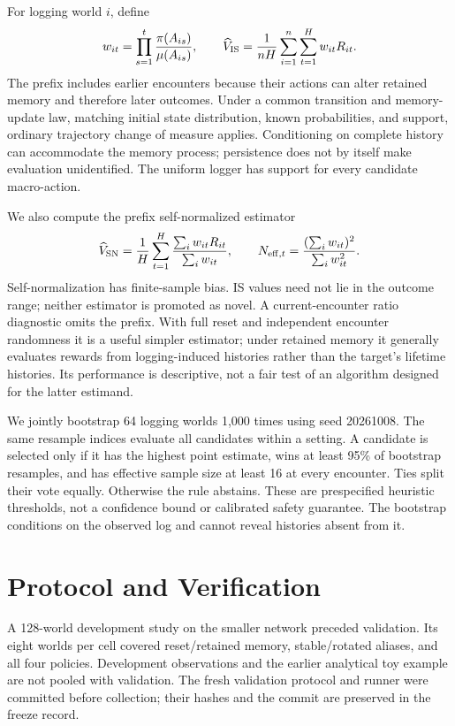 \documentclass[sigconf,nonacm]{acmart}
\begin{document}
For logging world $i$, define
\begin{equation}
w_{it}=\prod_{s=1}^{t}\frac{\pi(A_{is})}{\mu(A_{is})},\qquad
\widehat V_{\rm IS}=\frac{1}{nH}\sum_{i=1}^n\sum_{t=1}^H w_{it}R_{it}.
\end{equation}
The prefix includes earlier encounters because their actions can alter retained memory and therefore later outcomes. Under a common transition and memory-update law, matching initial state distribution, known probabilities, and support, ordinary trajectory change of measure applies. Conditioning on complete history can accommodate the memory process; persistence does not by itself make evaluation unidentified. The uniform logger has support for every candidate macro-action.

We also compute the prefix self-normalized estimator
\begin{equation}
\widehat V_{\rm SN}=\frac1H\sum_{t=1}^{H}\frac{\sum_i w_{it}R_{it}}{\sum_i w_{it}},\qquad
N_{{\rm eff},t}=\frac{(\sum_i w_{it})^2}{\sum_i w_{it}^2}.
\end{equation}
Self-normalization has finite-sample bias. IS values need not lie in the outcome range; neither estimator is promoted as novel. A current-encounter ratio diagnostic omits the prefix. With full reset and independent encounter randomness it is a useful simpler estimator; under retained memory it generally evaluates rewards from logging-induced histories rather than the target's lifetime histories. Its performance is descriptive, not a fair test of an algorithm designed for the latter estimand.

We jointly bootstrap 64 logging worlds 1,000 times using seed 20261008. The same resample indices evaluate all candidates within a setting. A candidate is selected only if it has the highest point estimate, wins at least 95\% of bootstrap resamples, and has effective sample size at least 16 at every encounter. Ties split their vote equally. Otherwise the rule abstains. These are prespecified heuristic thresholds, not a confidence bound or calibrated safety guarantee. The bootstrap conditions on the observed log and cannot reveal histories absent from it.

\section{Protocol and Verification}
A 128-world development study on the smaller network preceded validation. Its eight worlds per cell covered reset/retained memory, stable/rotated aliases, and all four policies. Development observations and the earlier analytical toy example are not pooled with validation. The fresh validation protocol and runner were committed before collection; their hashes and the commit are preserved in the freeze record.
\end{document}
